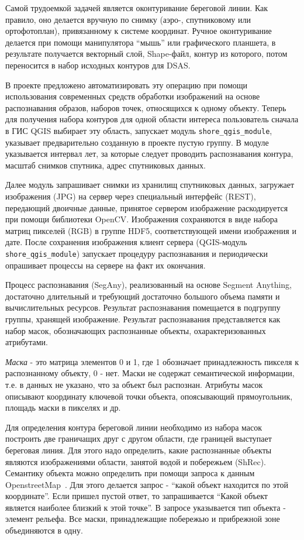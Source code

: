 \documentclass[732,fontsize=14pt,final]{studrep}
\begin{document}
Самой трудоемкой задачей является оконтуривание береговой линии. Как правило, оно делается вручную по снимку (аэро-, спутниковому или ортофотоплан), привязанному к системе координат. Ручное оконтуривание делается при помощи манипулятора “мышь” или графического планшета, в результате получается векторный слой, Shape-файл, контур из которого, потом переносится в набор исходных контуров для DSAS.

В проекте предложено автоматизировать эту операцию при помощи использования современных средств обработки изображений на основе распознавания образов, наборов точек, относящихся к одному объекту. Теперь для получения набора контуров для одной области интереса пользователь сначала в ГИС QGIS выбирает эту область, запускает модуль \verb|shore_qgis_module|, указывает предварительно созданную в проекте пустую группу. В модуле указывается интервал лет, за которые следует проводить распознавания контура, масштаб снимков спутника, адрес спутниковых данных.

Далее модуль запрашивает снимки из хранилищ спутниковых данных, загружает изображения (JPG) на сервер через специальный интерфейс (REST), передающий двоичные данные, принятое сервером изображение раскодируется при помощи библиотеки OpenCV. Изображения сохраняются в виде набора матриц пикселей (RGB) в группе HDF5, соответствующей имени изображения и дате. После сохранения изображения клиент сервера (QGIS-модуль \verb|shore_qgis_module|) запускает процедуру распознавания и периодически опрашивает процессы на сервере на факт их окончания.

Процесс распознавания (SegAny), реализованный на основе Segment Anything, достаточно длительный и требующий достаточно большого объема памяти и вычислительных ресурсов. Результат распознавания помещается в подгруппу группы, хранящей изображение. Результат распознавания представляется как набор масок, обозначающих распознанные объекты, охарактеризованных атрибутами. 

\emph{Маска} - это матрица элементов 0 и 1, где 1 обозначает принадлежность пикселя к распознанному объекту, 0 - нет. Маски не содержат семантической информации, т.е. в данных не указано, что за объект был распознан. Атрибуты масок описывают координату ключевой точки объекта, опоясывающий прямоугольник, площадь маски в пикселях и др.

Для определения контура береговой линии необходимо из набора масок построить две граничащих друг с другом области, где границей выступает береговая линия. Для этого надо определить, какие распознанные объекты являются изображениями области, занятой водой и побережьем (ShRec). Семантику объекта можно определить при помощи запроса к данным OpenstreetMap~\cite{osm}. Для этого делается запрос - “какой объект находится по этой координате”. Если пришел пустой ответ, то запрашивается “Какой объект является наиболее близкий к этой точке”. В запросе указывается тип объекта - элемент рельефа. Все маски, принадлежащие побережью и прибрежной зоне объединяются в одну.
\end{document}
